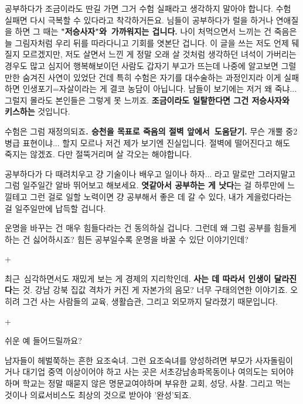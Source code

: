 공부하다가 조금이라도 딴길 가면 그거 수험 실패라고 생각하지 말아야 합니다.
수험 실패면 다시 극복할 수 있다라고 착각하거든요.
님들이 공부하다가 럴을 하거나 연애질을 하면 그 때는 \textbf{"저승사자"와 가까워지는 겁니다.}
나이 처먹으면서 느끼는 건 죽음은 늘 그림자처럼 우리 뒤를 따라다니고 기회를 엿본단 겁니다.
이 글을 쓰는 저도 언제 뒈질지 모르겠지만, 저도 살면서 느낀 게 정말 오래 살 것처럼 생각하던 녀석이 가버리는 경우도 많고
심지어 행복해보이던 사람도 갑자기 부고가 뜨는데 나중에 알고보면 그럴만한 숨겨진 사연이 있었단 건데
특히 수험은 자기를 대수술하는 과정인지라 이게 실패하면 인생포기=자살이라는 게 결코 농담이 아닙니다.
남들이 보기에는 저거 왜 죽냐... 그럴지 몰라도 본인들은 그렇게 못 느끼죠.
\textbf{조금이라도 일탈한다면 그건 저승사자와 키스하는} 것입니다.
\vspace{5mm}

수험은 그럼 재정의되죠\textbf{. 승천을 목표로 죽음의 절벽 앞에서 도움닫기.}
무슨 개뿔 중2병급 표현이냐... 할지 모르나 저건 제가 보기엔 진실입니다.
절벽에 떨어진다고 해도 죽지는 않겠죠. 다만 절뚝거리며 살 각오는 해야합니다.
\vspace{5mm}

공부하다가 다 때려치우고 걍 기술이나 배우고 일이나 하자... 라고 말로만 그러지말고
그럼 일주일간 알바 뛰어보고 해보세요. \textbf{엿같아서 공부하는 게 낫다}는 걸 하루만에 느낄테고
그런 걸로 일할 노력이면 걍 공부해서 좋은 데 갈 수 있다, 내가 게을렀다라는 걸 일주일만에 납득할 겁니다.
\vspace{5mm}

운명을 바꾸는 건 매우 힘들다라는 건 동의하실 겁니다.
그런데 왜 그럼 공부를 힘들게 하는 건 싫어하시죠?
힘든 공부일수록 운명을 바꿀 수 있단 이야기인데?
\vspace{5mm}

+
\vspace{5mm}

최근 심각하면서도 재밌게 보는 게 경제의 지리학인데.
\textbf{사는 데 따라서 인생이 달라진다}는 것.
강남 강북 집값 격차가 커진 게 자본가의 음모?
너무 구태의연한 이야기죠. 오히려 그건 사는 사람들의 교육, 생활습관, 그리고 외모까지 달라졌기 때문입니다.
\vspace{5mm}

+
\vspace{5mm}

쉬운 예 들어드릴까요?
\vspace{5mm}

남자들이 헤벌쭉하는 흔한 요조숙녀.
그런 요조숙녀를 양성하려면 부모가 사자돌림이거나 대기업 중역 이상이어야 하고
사는 곳은 서초강남송파목동이나 여의도는 되어야 하며
학교는 정말 때묻지 않은 명문교여야하며
부유한 교회, 성당, 사찰. 그리고 먹는 것이나 의료서비스도 최상의 것으로 받아야 '완성'되죠.
\vspace{5mm}

